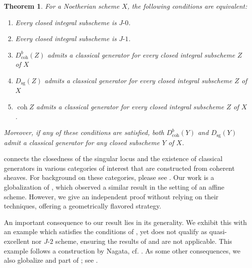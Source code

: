 \documentclass[11pt]{amsart}
\theoremstyle{plain}
\newtheorem{theorem}{Theorem}[section]
\theoremstyle{definition}
\numberwithin{equation}{section}
\numberwithin{theorem}{section}
\begin{document}
\begin{theorem}\label{thm:singular_locus_and_generation_closed_subschemes}
    For a Noetherian scheme $X$, the following conditions are equivalent:
    \begin{enumerate}
        \item \label{thm:main1} Every closed integral subscheme is $J\textrm{-}0$.
        \item \label{thm:main2} Every closed integral subscheme is $J\textrm{-}1$.
        \item \label{thm:main3} $D^b_{\operatorname{coh}}(Z)$ admits a classical generator for every closed integral subscheme $Z$ of $X$
        \item \label{thm:main4} $D_{\operatorname{sg}}(Z)$ admits a classical generator for every closed integral subscheme $Z$ of $X$
        \item \label{thm:main5} $\operatorname{coh} Z$ admits a classical generator for every closed integral subscheme $Z$ of $X$.
    \end{enumerate}
    Moreover, if any of these conditions are satisfied, both $D^b_{\operatorname{coh}}(Y)$ and $D_{\operatorname{sg}}(Y)$ admit a classical generator for any closed subscheme $Y$ of $X$.
\end{theorem}

 connects the closedness of the singular locus and the existence of classical generators in various categories of interest that are constructed from coherent sheaves. For background on these categories, please see . Our work is a globalization of \cite[Theorem 1.1]{Iyengar/Takahashi:2019}, which observed a similar result in the setting of an affine scheme. However, we give an independent proof without relying on their techniques, offering a geometrically flavored strategy. 

An important consequence to our result lies in its generality. We exhibit this with an example which satisfies the conditions of , yet does not qualify as quasi-excellent nor $J\textrm{-}2$ scheme, ensuring the results of \cite{Aoki:2021} and \cite{Elagin/Lunts/Schnurer:2020} are not applicable. This example follows a construction by Nagata, cf. . As some other consequences, we also globalize \cite[Corollary 2.7, Proposition 2.8]{Iyengar/Takahashi:2019} and part of \cite[Theorem I, Proposition I]{Nagata:1959}; see .  
\end{document}
